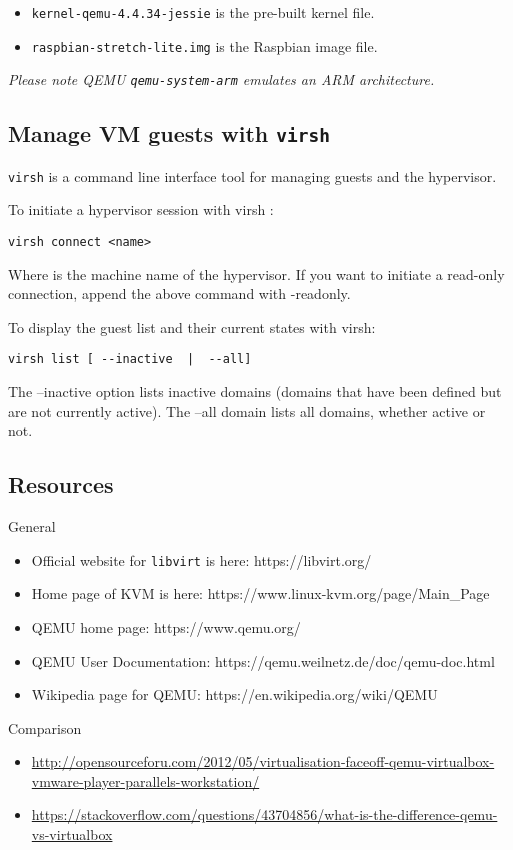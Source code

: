 \begin{itemize}
\tightlist
\item
  \texttt{kernel-qemu-4.4.34-jessie} is the pre-built kernel file.
\item
  \texttt{raspbian-stretch-lite.img} is the Raspbian image file.
\end{itemize}

\emph{Please note QEMU \texttt{qemu-system-arm} emulates an ARM
architecture.}

\hypertarget{manage-vm-guests-with-virsh}{%
\subsection{\texorpdfstring{Manage VM guests with
\texttt{virsh}}{Manage VM guests with virsh}}\label{manage-vm-guests-with-virsh}}

\texttt{virsh} is a command line interface tool for managing guests and
the hypervisor.

To initiate a hypervisor session with virsh :

\begin{verbatim}
virsh connect <name>
\end{verbatim}

Where is the machine name of the hypervisor. If you want to initiate a
read-only connection, append the above command with -readonly.

To display the guest list and their current states with virsh:

\begin{verbatim}
virsh list [ --inactive  |  --all]
\end{verbatim}

The --inactive option lists inactive domains (domains that have been
defined but are not currently active). The --all domain lists all
domains, whether active or not.

\hypertarget{resources}{%
\subsection{Resources}\label{resources}}

General

\begin{itemize}
\tightlist
\item
  Official website for \texttt{libvirt} is here: https://libvirt.org/
\item
  Home page of KVM is here: https://www.linux-kvm.org/page/Main\_Page
\item
  QEMU home page: https://www.qemu.org/
\item
  QEMU User Documentation: https://qemu.weilnetz.de/doc/qemu-doc.html
\item
  Wikipedia page for QEMU: https://en.wikipedia.org/wiki/QEMU
\end{itemize}

Comparison

\begin{itemize}
\tightlist
\item
  \url{http://opensourceforu.com/2012/05/virtualisation-faceoff-qemu-virtualbox-vmware-player-parallels-workstation/}
\item
  \url{https://stackoverflow.com/questions/43704856/what-is-the-difference-qemu-vs-virtualbox}
\end{itemize}
